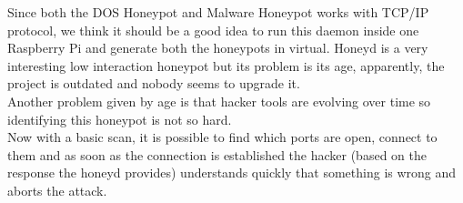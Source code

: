 Since both the DOS Honeypot and Malware Honeypot works with TCP/IP protocol, we think it should be a good idea to run this daemon inside one Raspberry Pi and generate both the honeypots in virtual.
Honeyd is a very interesting low interaction honeypot but its problem is its age, apparently, the project is outdated and nobody seems to upgrade it.\\
Another problem given by age is that hacker tools are evolving over time so identifying this honeypot is not so hard.\\
Now with a basic scan, it is possible to find which ports are open, connect to them and as soon as the connection is established the hacker (based on the response the honeyd provides) understands quickly that something is wrong and aborts the attack.
